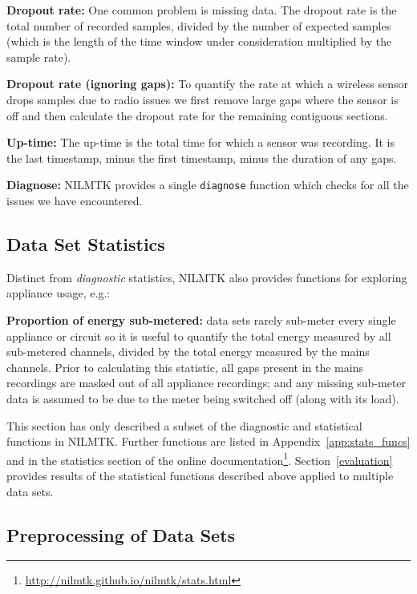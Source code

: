 \documentclass{sig-alternate}
\begin{document}
\textbf{Dropout rate:} One common problem is missing data.  The
dropout rate is the total number of recorded samples, divided by the
number of expected samples (which is the length of the time window
under consideration multiplied by the sample rate).

\textbf{Dropout rate (ignoring gaps):} To quantify the rate
at which a wireless sensor drops samples due to radio issues we
 first remove large gaps where the sensor is off and then
 calculate the dropout rate for the remaining contiguous sections.

\textbf{Up-time:}  The up-time is the total time for which a sensor
was recording.  It is the last timestamp, minus the first timestamp,
minus the duration of any gaps.

\textbf{Diagnose:} NILMTK provides a single \texttt{diagnose}
function which checks for all the issues we have encountered.

\subsection{Data Set Statistics}

Distinct from \emph{diagnostic} statistics, NILMTK also provides
functions for exploring appliance usage, e.g.:

\textbf{Proportion of energy sub-metered:} data sets rarely sub-meter
every single appliance or circuit so it is useful to quantify the
total energy measured by all sub-metered channels, divided by the
total energy measured by the mains channels. Prior to calculating this
statistic, all gaps present in the mains recordings are masked out of
all appliance recordings; and any missing sub-meter data is assumed to
be due to the meter being switched off (along with its load).

This section has only described a subset of the diagnostic and
statistical functions in NILMTK.  Further functions are listed
in Appendix~\ref{app:stats_funcs} and in the statistics section of the
online documentation\footnote{
  \url{http://nilmtk.github.io/nilmtk/stats.html}}.
Section~\ref{evaluation} provides results of the statistical
functions described above applied to multiple data sets.

\subsection{Preprocessing of Data Sets}
\label{sec:preprocessing}
\end{document}
